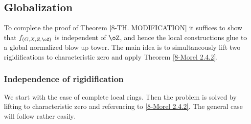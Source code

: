 \documentclass[10pt]{../fichiers-configuration-latex/smfart}
\begin{document}
\subsection{Globalization}\label{8-globalsec} To complete the
proof of Theorem \ref{8-TH. MODIFICATION} it suffices to show that
$f_{(G,X,Z,\oZ)}$ is independent of $\oZ$, and hence the local
constructions glue to a global normalized blow up tower. The main
idea is to simultaneously lift two rigidifications to characteristic
zero and apply Theorem \ref{8-Morel 2.4.2}.

\subsubsection{Independence of rigidification}\label{8-indeprigsec}
We start with the case of complete local rings. Then the problem
is solved by lifting to characteristic zero and referencing to
\ref{8-Morel 2.4.2}. The general case will follow rather easily.
\end{document}
